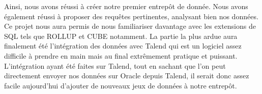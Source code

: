 \documentclass[a4paper,sffamily,12pt]{article}
\begin{document}
		\vspace{0.5cm}
		
		Ainsi, nous avons réussi à créer notre premier entrepôt de donnée. Nous avons également réussi à proposer des requêtes pertinentes, analysant bien nos données. Ce projet nous aura permis de nous familiariser davantage avec les extensions de SQL tels que ROLLUP et CUBE notamment. La partie la plus ardue aura finalement été l'intégration des données avec Talend qui est un logiciel assez difficile à prendre en main mais au final extrêmement pratique et puissant. L'intégration ayant été faites sur Talend, tout en sachant que l'on peut directement envoyer nos données sur Oracle depuis Talend, il serait donc assez facile aujourd'hui d'ajouter de nouveaux jeux de données à notre entrepôt. \\
						
\end{document}
